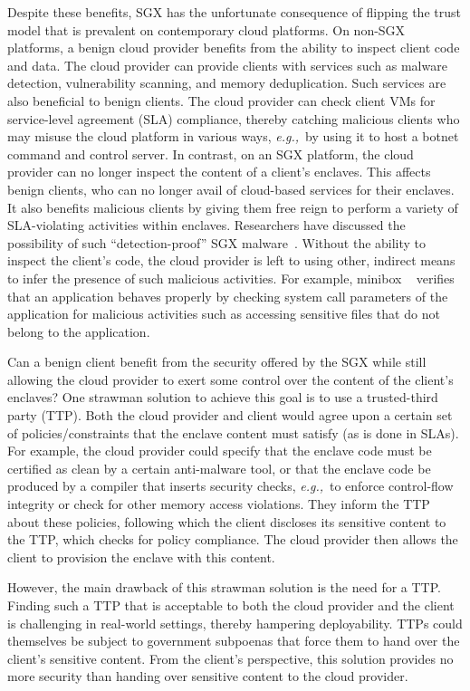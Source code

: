 \documentclass[conference,compsoc]{IEEEtran}
\newcommand{\eg}{\textit{e.g.,}\xspace}
\begin{document}
Despite these benefits, SGX has the unfortunate consequence of flipping the
trust model that is prevalent on contemporary cloud platforms. On non-SGX
platforms, a benign cloud provider benefits from the ability to inspect client
code and data. The cloud provider can provide clients with services such as
malware detection, vulnerability scanning, and memory deduplication. Such
services are also beneficial to benign clients.  The cloud provider can check
client VMs for service-level agreement (SLA) compliance, thereby catching
malicious clients who may misuse the cloud platform in various ways, \eg~by
using it to host a botnet command and control server. In contrast, on an SGX
platform, the cloud provider can no longer inspect the content of a client's
enclaves. This affects benign clients, who can no longer avail of cloud-based
services for their enclaves. It also benefits malicious clients by giving them
free reign to perform a variety of SLA-violating activities within enclaves.
Researchers have discussed the possibility of such ``detection-proof'' SGX
malware~\cite{davenportford:vbtn,rutkowska:aug13,rutkowska:sep13}.  Without the
ability to inspect the client's code, the cloud provider is left to using
other, indirect means to infer the presence of such malicious activities. For
example, minibox ~\cite{minibox:atc14} verifies that an application behaves properly
by checking system call parameters of the application for malicious activities such as
accessing sensitive files that do not belong to the application.

Can a benign client benefit from the security offered by the SGX while still
allowing the cloud provider to exert some control over the content of the
client's enclaves? One strawman solution to achieve this goal is to use a
trusted-third party (TTP). Both the cloud provider and client would agree upon
a certain set of policies/constraints that the enclave content must satisfy (as
is done in SLAs). For example, the cloud provider could specify that the
enclave code must be certified as clean by a certain anti-malware tool, or that
the enclave code be produced by a compiler that inserts security checks, \eg~to
enforce control-flow integrity or check for other memory access violations.
They inform the TTP about these policies, following which the client discloses
its sensitive content to the TTP, which checks for policy compliance.  The
cloud provider then allows the client to provision the enclave with this
content.

However, the main drawback of this strawman solution is the need for a TTP.
Finding such a TTP that is acceptable to both the cloud provider and the client
is challenging in real-world settings, thereby hampering deployability. TTPs
could themselves be subject to government subpoenas that force them to hand
over the client's sensitive content. From the client's perspective, this
solution provides no more security than handing over sensitive
content to the cloud provider.  
\end{document}
